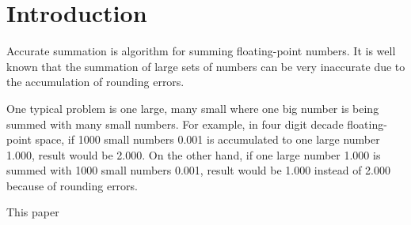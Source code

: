 \documentclass[conference]{IEEEtran}
\begin{document}
%
\IEEEpeerreviewmaketitle


\section{Introduction}
Accurate summation \cite{Higham} is algorithm for summing floating-point numbers. 
It is well known that the summation of large sets of numbers can be very inaccurate due
to the accumulation of rounding errors. 
\par
One typical problem is one large, many small \cite{} 
where one big number is being summed with many small numbers. 
For example, in four digit decade floating-point space,
if 1000 small numbers 0.001 is accumulated to one large number 1.000, result would be 2.000. On the other hand,
if one large number 1.000 is summed with 1000 small numbers 0.001,
result would be 1.000 instead of 2.000 because of rounding errors.
\par
This paper
\end{document}
